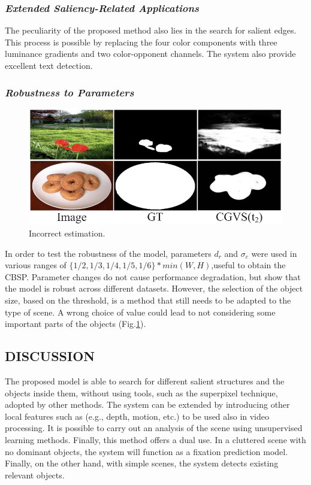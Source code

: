 \subsubsection{\emph{Extended Saliency-Related Applications}}
The peculiarity of the proposed method also lies in the search for salient 
edges. This process is possible by replacing the four color components with 
three luminance gradients and two color-opponent channels. The system also 
provide excellent text detection.

\subsubsection{\emph{Robustness to Parameters}}
\begin{figure}[htbp]
    \centering
    \includegraphics[width = 0.6 \linewidth]{images/paper1/bad threshold.png}
    \centering
    \caption{Incorrect estimation.}
    \label{fig: Incorrect}
\end{figure}
In order to test the robustness of the model, parameters $ d_r $ and $ \sigma_c $ were used 
in various ranges of $ \{ 1/2, 1/3, 1/4, 1/5, 1/6 \} * min(W,H) $,useful to obtain the 
CBSP. Parameter changes do not cause performance degradation, but show 
that the model is robust across different datasets. However, the 
selection of the object size, based on the threshold, is a method that still 
needs to be adapted to the type of scene. A wrong choice of value could lead 
to not considering some important parts of the objects (Fig.\ref{fig: Incorrect}).

\subsection{DISCUSSION}
The proposed model is able to search for different salient structures and the 
objects inside them, without using tools, such as the superpixel technique, 
adopted by other methods. The system can be extended by introducing 
other local features such as (e.g., depth, motion, etc.) to be used also 
in video processing. It is possible to carry out an analysis of the scene 
using unsupervised learning methods. Finally, this method offers a dual use. In 
a cluttered scene with no dominant objects, the system will function as a 
fixation prediction model. Finally, on the other hand, with simple scenes, 
the system detects existing relevant objects.